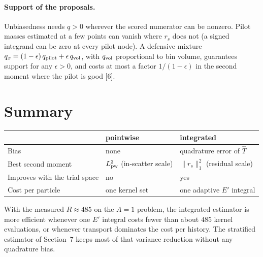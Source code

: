 \documentclass[11pt]{article}
\begin{document}
\paragraph{Support of the proposals.} Unbiasedness needs $q>0$ wherever the scored
numerator can be nonzero. Pilot masses estimated at a few points can vanish where
$r_s$ does not (a signed integrand can be zero at every pilot node). A defensive
mixture $q_x = (1-\epsilon)\,q_{\rm pilot} + \epsilon\, q_{\rm vol}$, with $q_{\rm vol}$
proportional to bin volume, guarantees support for any $\epsilon>0$, and costs at most
a factor $1/(1-\epsilon)$ in the second moment where the pilot is good [6].

\section{Summary}

\begin{center}
\begin{tabular}{lll}
\toprule
 & pointwise & integrated \\
\midrule
Bias & none & quadrature error of $\widehat T$ \\
Best second moment & $L_{\rm pw}^2$ (in-scatter scale) & $\|r_s\|_1^2$ (residual scale) \\
Improves with the trial space & no & yes \\
Cost per particle & one kernel set & one adaptive $E'$ integral \\
\bottomrule
\end{tabular}
\end{center}

\noindent With the measured $R\approx 485$ on the $A=1$ problem, the integrated
estimator is more efficient whenever one $E'$ integral costs fewer than about $485$
kernel evaluations, or whenever transport dominates the cost per history. The
stratified estimator of Section~7 keeps most of that variance reduction without any
quadrature bias.
\end{document}
